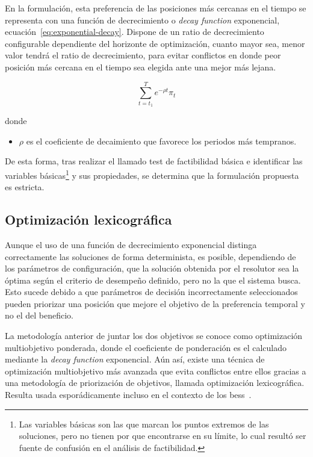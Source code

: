 En la formulación, esta preferencia de las posiciones más cercanas en el tiempo se representa con una función de decrecimiento o \textit{decay function} exponencial, ecuación~\ref{eq:exponential-decay}. Dispone de un ratio de decrecimiento configurable dependiente del horizonte de optimización, cuanto mayor sea, menor valor tendrá el ratio de decrecimiento, para evitar conflictos en donde peor posición más cercana en el tiempo sea elegida ante una mejor más lejana.

\begin{samepage}

  \begin{equation}%
    \label{eq:exponential-decay}
    \sum_{t = t_{1}}^{T} e^{-\rho t} \pi_{t}
  \end{equation}

  donde

  \begin{itemize}
    \item \( \rho \) es el coeficiente de decaimiento que favorece los periodos más tempranos.
  \end{itemize}

\end{samepage}

De esta forma, tras realizar el llamado test de factibilidad básica e identificar las variables básicas\footnote{Las variables básicas son las que marcan los puntos extremos de las soluciones, pero no tienen por que encontrarse en su límite, lo cual resultó ser fuente de confusión en el análisis de factibilidad.} y sus propiedades, se determina que la formulación propuesta es estricta.

\subsection{Optimización lexicográfica}%
\label{makereference5.3.1}

Aunque el uso de una función de decrecimiento exponencial distinga correctamente las soluciones de forma determinista, es posible, dependiendo de los parámetros de configuración, que la solución obtenida por el resolutor sea la óptima según el criterio de desempeño definido, pero no la que el sistema busca. Esto sucede debido a que parámetros de decisión incorrectamente seleccionados pueden priorizar una posición que mejore el objetivo de la preferencia temporal y no el del beneficio.

La metodología anterior de juntar los dos objetivos se conoce como optimización multiobjetivo ponderada, donde el coeficiente de ponderación es el calculado mediante la \textit{decay function} exponencial. Aún así, existe una técnica de optimización multiobjetivo más avanzada que evita conflictos entre ellos gracias a una metodología de priorización de objetivos, llamada optimización lexicográfica. Resulta usada esporádicamente incluso en el contexto de los \gls{bess}~\cite{karimi2019multi}.

